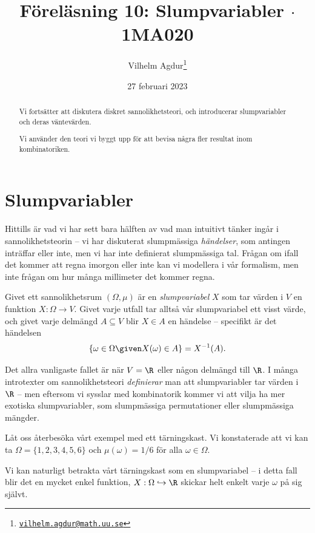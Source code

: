\documentclass[nobib]{tufte-handout}
\title{Föreläsning 10: Slumpvariabler $\cdot$ 1MA020}
\author[Vilhelm Agdur]{Vilhelm Agdur\thanks{\href{mailto:vilhelm.agdur@math.uu.se}{\nolinkurl{vilhelm.agdur@math.uu.se}}}}
\date{27 februari 2023}
\begin{document}

\maketitle%

\begin{abstract}
\noindent
Vi fortsätter att diskutera diskret sannolikhetsteori, och introducerar slumpvariabler och deras väntevärden.

Vi använder den teori vi byggt upp för att bevisa några fler resultat inom kombinatoriken.
\end{abstract}

\section{Slumpvariabler}

Hittills är vad vi har sett bara hälften av vad man intuitivt tänker ingår i sannolikhetsteorin -- vi har diskuterat slumpmässiga \emph{händelser}, som antingen inträffar eller inte, men vi har inte definierat slumpmässiga tal. Frågan om ifall det kommer att regna imorgon eller inte kan vi modellera i vår formalism, men inte frågan om hur många millimeter det kommer regna.

\begin{definition}
    Givet ett sannolikhetsrum $(\Omega, \mu)$ är en \emph{slumpvariabel} $X$ som tar värden i $V$ en funktion $X: \Omega \to V$. Givet varje utfall tar alltså vår slumpvariabel ett visst värde, och givet varje delmängd $A\subseteq V$ blir $X\in A$ en händelse -- specifikt är det händelsen
    $$\left\{\omega \in \Omega \given X(\omega) \in A\right\} = X^{-1}(A).$$
\end{definition}

Det allra vanligaste fallet är när $V = \R$ eller någon delmängd till $\R$. I många introtexter om sannolikhetsteori \emph{definierar} man att slumpvariabler tar värden i $\R$ -- men eftersom vi sysslar med kombinatorik kommer vi att vilja ha mer exotiska slumpvariabler, som slumpmässiga permutationer eller slumpmässiga mängder.

\begin{example}
    Låt oss återbesöka vårt exempel med ett tärningskast. Vi konstaterade att vi kan ta $\Omega = \{1,2,3,4,5,6\}$ och $\mu(\omega) = 1/6$ för alla $\omega \in \Omega$.

    Vi kan naturligt betrakta vårt tärningskast som en slumpvariabel -- i detta fall blir det en mycket enkel funktion, $X: \Omega \hookrightarrow \R$ skickar helt enkelt varje $\omega$ på sig självt.
\end{example}
\end{document}
